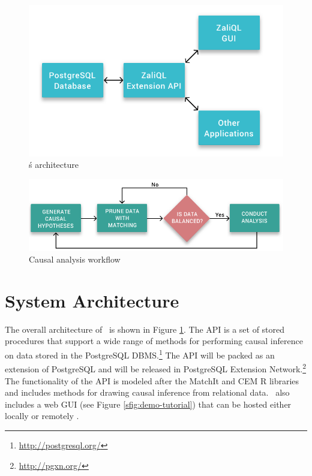
\begin{figure}
 \includegraphics[scale=0.25]{Figures/System-Overview.png}
  \vspace{-3.3mm} \caption{\GSQLB\'s architecture}
 
  \label{fig:arch}
  \vspace{-3mm}
\end{figure}


\begin{figure}
  \includegraphics[scale=0.25]{Figures/Matching-Flowchart.png}
  \vspace{-3mm}\caption{Causal analysis workflow}

\label{fig:flowchart}
\vspace{-0.3cm}
\end{figure}



\section{System Architecture}

The overall architecture of \GSQL\ is shown in Figure \ref{fig:arch}.
The API is a set of stored procedures that support a wide
range of methods for performing causal inference on data stored in the
PostgreSQL DBMS.\footnote{\url{http://postgresql.org/}}
The API will be packed  as an extension of  PostgreSQL and will be released in
PostgreSQL Extension Network.\footnote{\url{http://pgxn.org/}}
The functionality of the API is modeled after the MatchIt and CEM R
libraries \cite{ho2005,iacus2009cem} and includes methods for drawing causal inference from relational data. \GSQL\ also includes a web GUI
(see Figure \ref{sfig:demo-tutorial}) that can be hosted either locally or
remotely . %

